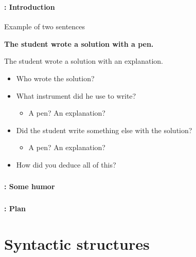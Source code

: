 \documentclass[xcolor=table]{beamer}
\subtitle[06- Parsing]{Chapter 06\\Parsing}
\begin{document}
	
\begin{frame}
	\frametitle{\inserttitle}
	\framesubtitle{\insertshortsubtitle: Introduction}

	\begin{exampleblock}{Example of two sentences}
		\begin{center}
			\Large\bfseries
			The student wrote a solution with a pen. 
			
			The student wrote a solution with an explanation.
		\end{center}
	\end{exampleblock}
	
	\begin{itemize}
		\item Who wrote the solution?
		\item What instrument did he use to write?
		\begin{itemize}
			\item A pen? An explanation?
		\end{itemize}
		\item Did the student write something else with the solution?
		\begin{itemize}
			\item A pen? An explanation?
		\end{itemize}
		\item How did you deduce all of this?
	\end{itemize}

\end{frame}

\begin{frame}
	\frametitle{\inserttitle}
	\framesubtitle{\insertshortsubtitle: Some humor}

	\begin{center}
	\end{center}

\end{frame}

\begin{frame}
	\frametitle{\inserttitle}
	\framesubtitle{\insertshortsubtitle: Plan}

	\begin{multicols}{2}
	\tableofcontents
	\end{multicols}

\end{frame}

\section{Syntactic structures}
\end{document}
